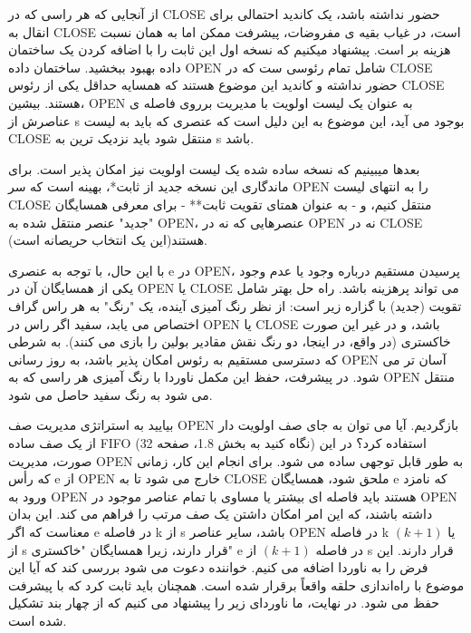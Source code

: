 \documentclass{book} %
\begin{document}
از آنجایی که هر راسی که در CLOSE حضور نداشته باشد، یک کاندید احتمالی برای انقال به CLOSE است، در غیاب بقیه ی مفروضات، پیشرفت ممکن اما به همان نسبت هزینه بر است.
پیشنهاد میکنیم که نسخه اول این ثابت را با اضافه کردن یک ساختمان داده بهبود ببخشید. ساختمان داده OPEN شامل تمام رئوسی ست که در CLOSE حضور نداشته و کاندید این موضوع هستند که همسایه حداقل یکی از رئوس CLOSE هستند.
بیشین، OPEN به عنوان یک لیست اولویت با مدیریت برروی فاصله ی عناصرش از ‌s بوجود می آید، این موضوع به این دلیل است که عنصری که باید به لیست CLOSE منتقل شود باید نزدیک ترین به s باشد.


بعدها میبینیم که نسخه ساده شده یک لیست اولویت نیز امکان پذیر است. برای ماندگاری این نسخه جدید از ثابت*، بهینه است که سر OPEN را به انتهای لیست CLOSE منتقل کنیم، و - به عنوان همتای تقویت ثابت** - برای معرفی همسایگان "جدید" عنصر منتقل شده به OPEN، عنصرهایی که نه در OPEN نه در CLOSE هستند(این یک انتخاب حریصانه است).

با این حال، با توجه به عنصری e در OPEN، پرسیدن مستقیم درباره وجود یا عدم وجود یکی از همسایگان آن در OPEN یا CLOSE می تواند پرهزینه باشد. راه حل بهتر شامل تقویت (جدید) با گزاره زیر است: از نظر رنگ آمیزی آینده، یک "رنگ" به هر راس گراف اختصاص می یابد، سفید اگر راس در OPEN یا CLOSE باشد، و در غیر این صورت خاکستری (در واقع، در اینجا، دو رنگ نقش مقادیر بولین را بازی می کنند). به شرطی که دسترسی مستقیم به رئوس امکان پذیر باشد، به روز رسانی OPEN آسان تر می شود. در پیشرفت، حفظ این مکمل ناوردا با رنگ آمیزی هر راسی که به OPEN منتقل می شود به رنگ سفید حاصل می شود.

بیایید به استراتژی مدیریت صف OPEN بازگردیم. آیا می توان به جای صف اولویت دار از یک صف ساده FIFO (نگاه کنید به بخش 1.8، صفحه 32) استفاده کرد؟ در این صورت، مدیریت OPEN به طور قابل توجهی ساده می شود. برای انجام این کار، زمانی که رأس e از OPEN خارج می شود تا به CLOSE ملحق شود، همسایگان e که نامزد ورود به OPEN هستند باید فاصله ای بیشتر یا مساوی با تمام عناصر موجود در OPEN داشته باشند، که این امر امکان داشتن یک صف مرتب را فراهم می کند. این بدان معناست که اگر e در فاصله k از s باشد، سایر عناصر OPEN در فاصله k یا $(k + 1)$ از s قرار دارند، زیرا همسایگان "خاکستری" e در فاصله $(k + 1)$ از s قرار دارند. این فرض را به ناوردا اضافه می کنیم. خواننده دعوت می شود بررسی کند که آیا این موضوع با راه‌اندازی حلقه واقعاً برقرار شده است. همچنان باید ثابت کرد که با پیشرفت حفظ می شود. در نهایت، ما ناوردای زیر را پیشنهاد می کنیم که از چهار بند تشکیل شده است.
\end{document}

